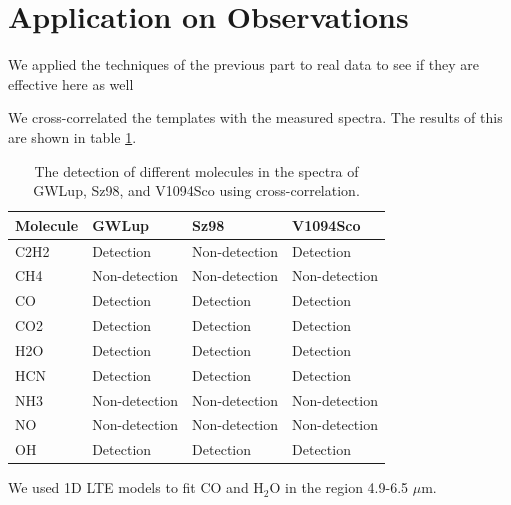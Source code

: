 \documentclass[oneside, single, authoryear, semicolon]{lion-msc}
\newcommand{\4}{$_4$}
\newcommand{\3}{$_3$}
\newcommand{\2}{$_2$}
\begin{document}
\section{Application on Observations}
We applied the techniques of the previous part to real data to see if they are effective here as well

We cross-correlated the templates with the measured spectra. The results of this are shown in table \ref{tab: realdata}.

\begin{table}[!ht]
\centering
\begin{tabular}{llll}
\hline
\textbf{Molecule} & \textbf{GWLup} & \textbf{Sz98} & \textbf{V1094Sco} \\ \hline
C2H2            & Detection      & Non-detection & Detection         \\
CH4             & Non-detection  & Non-detection & Non-detection     \\
CO              & Detection      & Detection     & Detection         \\
CO2             & Detection      & Detection     & Detection         \\
H2O             & Detection      & Detection     & Detection         \\
HCN             & Detection      & Detection     & Detection         \\
NH3             & Non-detection  & Non-detection & Non-detection     \\
NO              & Non-detection  & Non-detection & Non-detection     \\
OH              & Detection      & Detection     & Detection         \\ \hline
\end{tabular}
\caption{The detection of different molecules in the spectra of GWLup, Sz98, and V1094Sco using cross-correlation.}
\label{tab: realdata}
\end{table}


We used 1D LTE models to fit CO and H\2O in the region 4.9-6.5 $\mu$m.
\end{document}
